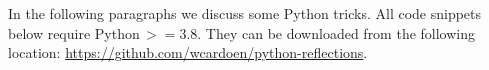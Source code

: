 \documentclass[10pt]{article}
\begin{document}
\title{}
\author{Wim R.M. Cardoen \\ Email: \$(prefix)[at]gmail[dot]com \\ where \\ prefix='wcardoen' }
\date{\today}
\maketitle
\thispagestyle{empty}
\pagestyle{plain}
\setcounter{page}{1}
\renewcommand \thesection{\Roman{section}} 

In the following paragraphs we discuss some Python tricks.
All code snippets below require Python\,$>=3.8$.  
They can be downloaded from the following location:\newline
\href{https://github.com/wcardoen/python-reflections.git}{https://github.com/wcardoen/python-reflections}.
\end{document}
